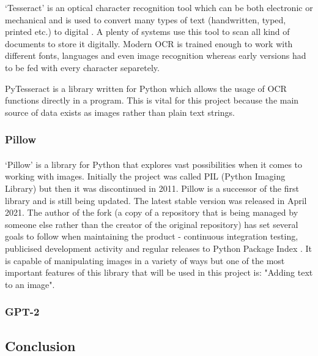\documentclass[12pt]{report}
\begin{document}
    `Tesseract' is an optical character recognition tool which can be both electronic or mechanical and is used to convert many types of text (handwritten, typed, printed etc.) to digital \citep{tesseract_article}. A plenty of systems use this tool to scan all kind of documents to store it digitally.
    Modern OCR is trained enough to work with different fonts, languages and even image recognition whereas early versions had to be fed with every character separetely.

    PyTesseract is a library written for Python which allows the usage of OCR functions directly in a program. This is vital for this project because the main source of data exists as images rather than plain text strings.

    \subsubsection{Pillow}
    \paragraph{}

    `Pillow' is a library for Python that explores vast possibilities when it comes to working with images. Initially the project was called PIL (Python Imaging Library) but then it was discontinued in 2011.
    Pillow is a successor of the first library and is still being updated. The latest stable version was released in April 2021. The author of the fork (a copy of a repository that is being managed by someone else rather than the creator of the original repository) has set several goals to follow when maintaining the product - continuous integration testing, publicised development activity and regular releases to Python Package Index \citep{pillow_about}. 
    It is capable of manipulating images in a variety of ways but one of the most important features of this library that will be used in this project is: "Adding text to an image".

    \subsubsection*{GPT-2}
    \paragraph{}

    \subsection*{Conclusion}
    \paragraph{}

    {}
    
\end{document}
